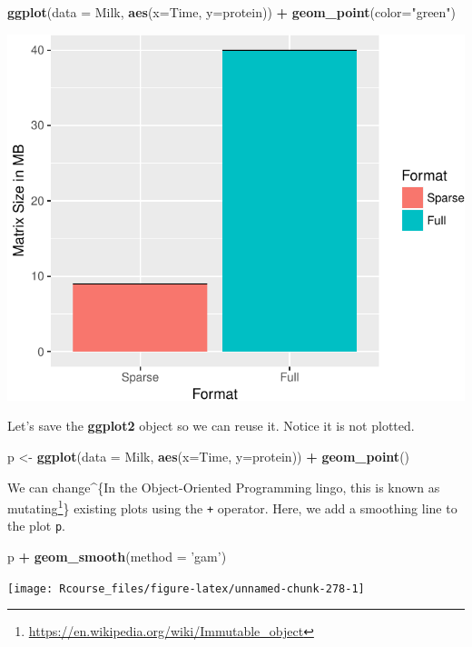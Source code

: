 \documentclass[]{book}
\newenvironment{Shaded}{\begin{snugshade}}{\end{snugshade}}
\newcommand{\DataTypeTok}[1]{\textcolor[rgb]{0.13,0.29,0.53}{#1}}
\newcommand{\KeywordTok}[1]{\textcolor[rgb]{0.13,0.29,0.53}{\textbf{#1}}}
\newcommand{\NormalTok}[1]{#1}
\newcommand{\OperatorTok}[1]{\textcolor[rgb]{0.81,0.36,0.00}{\textbf{#1}}}
\newcommand{\StringTok}[1]{\textcolor[rgb]{0.31,0.60,0.02}{#1}}
\renewcommand{\href}[2]{#2\footnote{\url{#1}}}
\theoremstyle{definition}
\theoremstyle{definition}
\theoremstyle{definition}
\theoremstyle{remark}
\begin{document}
\begin{Shaded}
\begin{Highlighting}[]
\KeywordTok{ggplot}\NormalTok{(}\DataTypeTok{data =}\NormalTok{ Milk, }\KeywordTok{aes}\NormalTok{(}\DataTypeTok{x=}\NormalTok{Time, }\DataTypeTok{y=}\NormalTok{protein)) }\OperatorTok{+}
\StringTok{  }\KeywordTok{geom_point}\NormalTok{(}\DataTypeTok{color=}\StringTok{"green"}\NormalTok{)}
\end{Highlighting}
\end{Shaded}

\includegraphics[width=0.5\linewidth]{Rcourse_files/figure-latex/unnamed-chunk-276-1}

Let's save the \textbf{ggplot2} object so we can reuse it.
Notice it is not plotted.

\begin{Shaded}
\begin{Highlighting}[]
\NormalTok{p <-}\StringTok{ }\KeywordTok{ggplot}\NormalTok{(}\DataTypeTok{data =}\NormalTok{ Milk, }\KeywordTok{aes}\NormalTok{(}\DataTypeTok{x=}\NormalTok{Time, }\DataTypeTok{y=}\NormalTok{protein)) }\OperatorTok{+}
\StringTok{  }\KeywordTok{geom_point}\NormalTok{()}
\end{Highlighting}
\end{Shaded}

We can change\^{}\{In the Object-Oriented Programming lingo, this is known as \href{https://en.wikipedia.org/wiki/Immutable_object}{mutating}\} existing plots using the \texttt{+} operator.
Here, we add a smoothing line to the plot \texttt{p}.

\begin{Shaded}
\begin{Highlighting}[]
\NormalTok{p }\OperatorTok{+}\StringTok{ }\KeywordTok{geom_smooth}\NormalTok{(}\DataTypeTok{method =} \StringTok{'gam'}\NormalTok{)}
\end{Highlighting}
\end{Shaded}

\texttt{[image: Rcourse\_files/figure-latex/unnamed-chunk-278-1]}
\end{document}
